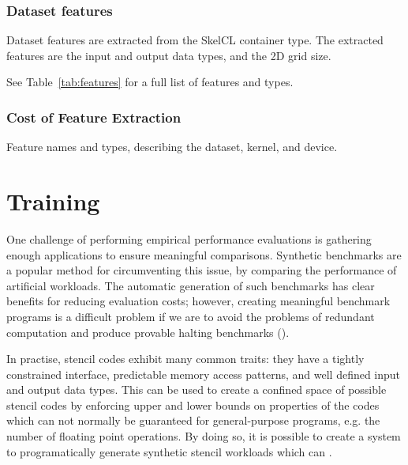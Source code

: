 

\subsubsection{Dataset features}

Dataset features are extracted from the SkelCL container type. The
extracted features are the input and output data types, and the 2D
grid size.

See Table~\ref{tab:features} for a full list of features and
types.

\subsubsection{Cost of Feature Extraction}


\begin{table}

\caption{Feature names and types, describing the dataset, kernel,
  and device.}
\label{tab:features}
\end{table}


\section{Training}

One challenge of performing empirical performance evaluations is
gathering enough applications to ensure meaningful
comparisons. Synthetic benchmarks are a popular method for
circumventing this issue, by comparing the performance of artificial
workloads. The automatic generation of such benchmarks has clear
benefits for reducing evaluation costs; however, creating meaningful
benchmark programs is a difficult problem if we are to avoid the
problems of redundant computation and produce provable halting
benchmarks ().

In practise, stencil codes exhibit many common traits: they have a
tightly constrained interface, predictable memory access patterns, and
well defined input and output data types. This can be used to create a
confined space of possible stencil codes by enforcing upper and lower
bounds on properties of the codes which can not normally be guaranteed
for general-purpose programs, e.g. the number of floating point
operations. By doing so, it is possible to create a system to
programatically generate synthetic stencil workloads which can
\TODO{\ldots}.

